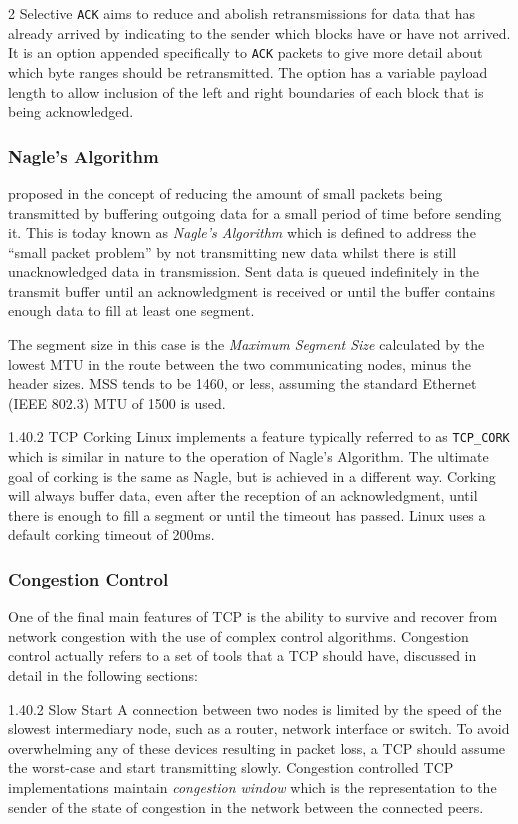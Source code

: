 \documentclass[11pt,a4paper,british]{bhamarticle}
\makeatletter
\newcounter{subsubsubsection}[subsubsection]
\newcommand\subsubsubsection{%
    \@startsection{subsubsubsection}{4}
        {\z@}{1.4\parskip}{0.2\parskip}
        {\normalfont\normalsize\bfseries}
}
\makeatother
\begin{document}
\begin{multicols}{2}
Selective \texttt{ACK} aims to reduce and abolish retransmissions for data that has already arrived by indicating to the sender which blocks have or have not arrived. It is an option appended specifically to \texttt{ACK} packets to give more detail about which byte ranges should be retransmitted. The option has a variable payload length to allow inclusion of the left and right boundaries of each block that is being acknowledged.

\subsubsection{Nagle's Algorithm}
\citeauthor{rfc896} proposed in \citeyear{rfc896} the concept of reducing the amount of small packets being transmitted by buffering outgoing data for a small period of time before sending it. This is today known as \textit{Nagle's Algorithm} which is defined to address the ``small packet problem'' by not transmitting new data whilst there is still unacknowledged data in transmission. Sent data is queued indefinitely in the transmit buffer until an acknowledgment is received or until the buffer contains enough data to fill at least one segment.

The segment size in this case is the \textit{Maximum Segment Size} calculated by the lowest MTU in the route between the two communicating nodes, minus the header sizes. MSS tends to be 1460, or less, assuming the standard Ethernet (IEEE 802.3) MTU of 1500 is used.

\subsubsubsection{TCP Corking}
Linux implements a feature typically referred to as \texttt{TCP\_CORK} which is similar in nature to the operation of Nagle's Algorithm. The ultimate goal of corking is the same as Nagle, but is achieved in a different way. Corking will always buffer data, even after the reception of an acknowledgment, until there is enough to fill a segment or until the timeout has passed.  Linux uses a default corking timeout of 200ms.

\subsubsection{Congestion Control}
One of the final main features of TCP is the ability to survive and recover from network congestion with the use of complex control algorithms. Congestion control actually refers to a set of tools that a TCP should have, discussed in detail in the following sections:

\subsubsubsection{Slow Start}
A connection between two nodes is limited by the speed of the slowest intermediary node, such as a router, network interface or switch. To avoid overwhelming any of these devices resulting in packet loss, a TCP should assume the worst-case and start transmitting slowly. Congestion controlled TCP implementations maintain \textit{congestion window} which is the representation to the sender of the state of congestion in the network between the connected peers.


\end{multicols}
\end{document}
